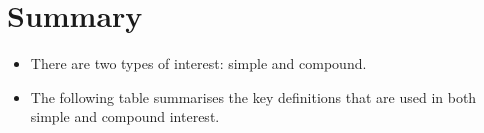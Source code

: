             \section{ Summary}
            \nopagebreak
            \label{m39335*eip-923}\begin{itemize}[noitemsep]
            \item There are two types of interest: simple and compound.\item The following table summarises the key definitions that are used in both simple and compound interest.
    \setlength\mytablespace{4\tabcolsep}
    \addtolength\mytablespace{3\arrayrulewidth}
    \setlength\mytablewidth{\linewidth}
    \setlength\mytableroom{\mytablewidth}
    \addtolength\mytableroom{-\mytablespace}
    \setlength\myfixedwidth{0pt}
    \setlength\mystarwidth{\mytableroom}
        \addtolength\mystarwidth{-\myfixedwidth}
        \divide{}
\end{itemize}
